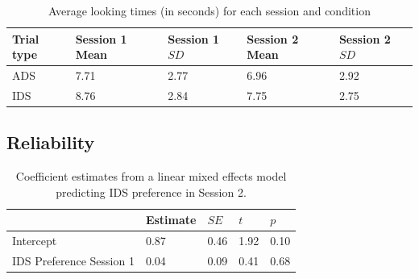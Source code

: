 \documentclass[
  man,floatsintext]{apa6}
\begin{document}
\begin{table}[tbp]

\begin{center}
\begin{threeparttable}

\caption{\label{tab:descriptives_table1}Average looking times (in seconds) for each session and condition}

\begin{tabular}{lllll}
\toprule
Trial type & Session 1 Mean & Session 1 $SD$ & Session 2 Mean & Session 2 $SD$\\
\midrule
ADS & 7.71 & 2.77 & 6.96 & 2.92\\
IDS & 8.76 & 2.84 & 7.75 & 2.75\\
\bottomrule
\end{tabular}

\end{threeparttable}
\end{center}

\end{table}

\hypertarget{reliability}{%
\subsection{Reliability}\label{reliability}}

\begin{table}[tbp]

\begin{center}
\begin{threeparttable}

\caption{\label{tab:coef_table2}Coefficient estimates from a linear mixed effects model predicting IDS preference in Session 2.}

\begin{tabular}{lllll}
\toprule
 & Estimate & $SE$ & $t$ & $p$\\
\midrule
Intercept & 0.87 & 0.46 & 1.92 & 0.10\\
IDS Preference Session 1 & 0.04 & 0.09 & 0.41 & 0.68\\
\bottomrule
\end{tabular}

\end{threeparttable}
\end{center}

\end{table}
\end{document}
